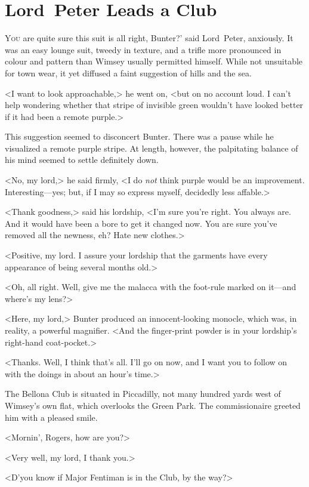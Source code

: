 \chapter{Lord~Peter Leads a Club}
\lettrine[ante=‘]{Y}{ou} are quite sure this suit is all right, Bunter?' said Lord~Peter, anxiously. It was an easy lounge suit, tweedy in texture, and a trifle more pronounced in colour and pattern than Wimsey usually permitted himself. While not unsuitable for town wear, it yet diffused a faint suggestion of hills and the sea.

<I want to look approachable,> he went on, <but on no account loud. I can't help wondering whether that stripe of invisible green wouldn't have looked better if it had been a remote purple.>

This suggestion seemed to disconcert Bunter. There was a pause while he visualized a remote purple stripe. At length, however, the palpitating balance of his mind seemed to settle definitely down.

<No, my lord,> he said firmly, <I do \emph{not} think purple would be an improvement. Interesting—yes; but, if I may so express myself, decidedly less affable.>

<Thank goodness,> said his lordship, <I'm sure you're right. You always are. And it would have been a bore to get it changed now. You are sure you've removed all the newness, eh? Hate new clothes.>

<Positive, my lord. I assure your lordship that the garments have every appearance of being several months old.>

<Oh, all right. Well, give me the malacca with the foot-rule marked on it—and where's my lens?>

<Here, my lord,> Bunter produced an innocent-looking monocle, which was, in reality, a powerful magnifier. <And the finger-print powder is in your lordship's right-hand coat-pocket.>

<Thanks. Well, I think that's all. I'll go on now, and I want you to follow on with the doings in about an hour's time.>

The Bellona Club is situated in Piccadilly, not many hundred yards west of Wimsey's own flat, which overlooks the Green Park. The commissionaire greeted him with a pleased smile.

<Mornin', Rogers, how are you?>

<Very well, my lord, I thank you.>

<D'you know if Major Fentiman is in the Club, by the way?>

